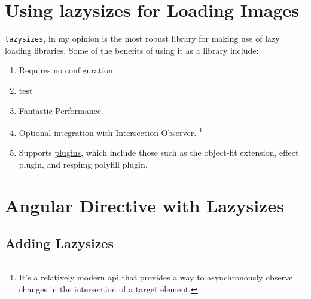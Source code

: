 \section{ Using lazysizes for Loading Images }
\lstinline{lazysizes}, in my opinion is the most robust library for making
use of lazy loading libraries. Some of the benefits of using it as a library 
include: 
\begin{enumerate}
  \item Requires no configuration.
  \item test
  \item Fantastic Performance.
  \item Optional integration with \href{https://developer.mozilla.org/en-US/docs/Web/API/Intersection_Observer_API}{Intersection Observer}. 
  \footnote{It's a relatively modern api that provides a way to asynchronously observe 
  changes in the intersection of a target element.}
  \item Supports \href{https://github.com/aFarkas/lazysizes#plugins}{plugins}, 
  which include those such as the object-fit extension, effect plugin, and 
  respimg polyfill plugin.
\end{enumerate}

\section{Angular Directive with Lazysizes}

\subsection{Adding Lazysizes}






